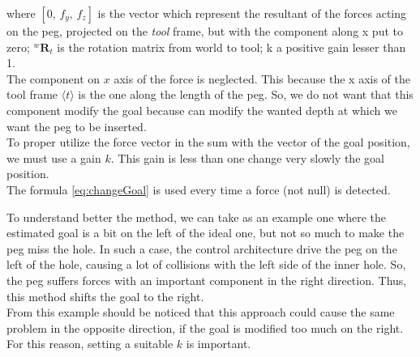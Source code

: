 where $[ 0, \, f_y, \, f_z ]$ is the vector which represent the resultant of the forces acting on the peg, projected on the \textit{tool} frame, but with the component along x put to zero; $^{w}\boldsymbol{R}_t$ is the rotation matrix from world to tool; k a positive gain lesser than 1.\\
The component on $x$ axis of the force is neglected. This because the x axis of the tool frame $ \langle t \rangle $ is the one along the length of the peg. So, we do not want that this component modify the goal because can modify the wanted depth at which we want the peg to be inserted.\\
To proper utilize the force vector in the sum with the vector of the goal position, we must use a gain $k$. This gain is less than one change very slowly the goal position.\\
The formula \eqref{eq:changeGoal} is used every time a force (not null) is detected.

To understand better the method, we can take as an example one where the estimated goal is a bit on the left of the ideal one, but not so much to make the peg miss the hole. In such a case, the control architecture drive the peg on the left of the hole, causing a lot of collisions with the left side of the inner hole. So, the peg suffers forces with an important component in the right direction. Thus, this method shifts the goal to the right.\\
From this example should be noticed that this approach could cause the same problem in the opposite direction, if the goal is modified too much on the right. For this reason, setting a suitable $k$ is important.


